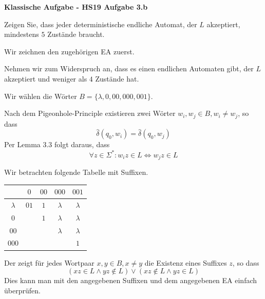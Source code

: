 \documentclass[a4paper, 11pt]{article}
\newcommand\myTitle[1]{{\large \textbf {#1}}}
\begin{document}
    
    
        \myTitle{Klassische Aufgabe - HS19 Aufgabe 3.b}

        Zeigen Sie, dass jeder deterministische endliche Automat, der $L$ akzeptiert, mindestens $5$ Zustände braucht.
        
        
        Wir zeichnen den zugehörigen EA zuerst.

    
        Nehmen wir zum Widerspruch an, dass es einen endlichen Automaten gibt, der $L$ akzeptiert und weniger als $4$ Zustände hat.
    
        Wir wählen die Wörter $B = \{\lambda, 0, 00, 000, 001\}$.
    
        Nach dem Pigeonhole-Principle existieren zwei Wörter $w_i, w_j \in B, w_i \neq w_j$, so dass 
        $$\hat{\delta}(q_0, w_i) = \hat{\delta}(q_0, w_j)$$
        Per Lemma 3.3 folgt daraus, dass 
        $$\forall z \in \Sigma^*: w_iz \in L \iff w_jz \in L$$
        
        Wir betrachten folgende Tabelle mit Suffixen.
        \begin{table}[htp]
            \centering
            \begin{tabular}{c|cccc}
                          & $0$  & $00$& $000$     & $001$    \\
                \hline
                $\lambda$ & $01$ & $1$ & $\lambda$ & $\lambda$\\
                $0$       &      & $1$ & $\lambda$ & $\lambda$\\
                $00$      &      &     & $\lambda$ & $\lambda$ \\
                $000$     &      &     &           & $1$ 
            \end{tabular}
        \end{table}
        Der zeigt für jedes Wortpaar $x, y \in B, x \neq y$ die Existenz eines Suffixes $z$, so dass 
        $$\left(xz \in L \land yz \notin L\right) \lor \left(xz \notin L \land yz \in L\right)$$
        Dies kann man mit den angegebenen Suffixen und dem angegebenen EA einfach überprüfen.
    
\end{document}
